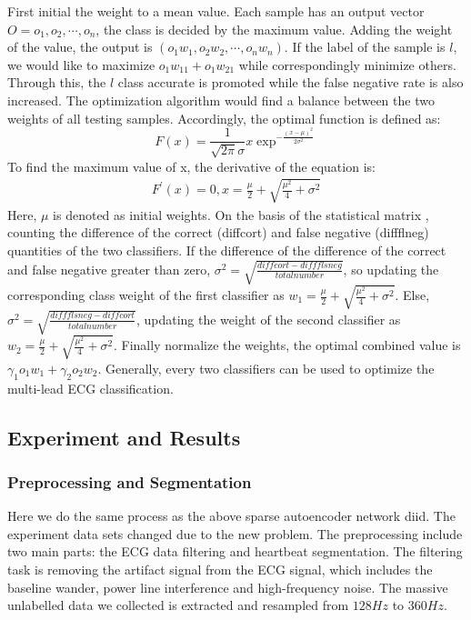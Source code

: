 \documentclass[graybox]{svmult}
\begin{document}
First initial the weight to a mean value. Each sample has an output vector $O = {o_1, o_2, \cdots, o_n}$, the class is decided by the maximum value. Adding the weight of the value, the output is $(o_1w_1 ,o_2w_2, \cdots, o_nw_n)$. If the label of the sample is $l$, we would like to maximize $o_1w_{11} + o_1w_{21}$ while correspondingly minimize others. Through this, the $l$ class accurate is promoted while the false negative rate is also increased. The optimization algorithm would find a balance between the two weights of all testing samples. Accordingly, the optimal function is defined as:
\begin{equation}
F(x) = \frac{1}{\sqrt{2\pi}\sigma}x\exp^{-\frac{(x-\mu)^2}{2\sigma^2}}
\end{equation}
To find the maximum value of x, the derivative of the equation is:
\begin{equation}
\begin{split}
F^{'}(x) = 0, x = \frac{\mu}{2}+\sqrt{\frac{\mu^2}{4}+\sigma^2}
\end{split}
\end{equation}
Here, $\mu$ is denoted as initial weights. On the basis of the statistical matrix , counting the difference of the correct (diffcort) and false negative (diffflneg) quantities of the two classifiers. If the difference of the difference of the correct and false negative greater than zero, $\sigma^2 = \sqrt{\frac{diffcort - diffflsneg}{totalnumber}}$, so updating the corresponding class weight of the first classifier as $w_1 = \frac{\mu}{2}+\sqrt{\frac{\mu^2}{4}+\sigma^2}$. Else, $\sigma^2 = \sqrt{\frac{diffflsneg - diffcort}{totalnumber}}$, updating the weight of the second classifier as $w_2 = \frac{\mu}{2}+\sqrt{\frac{\mu^2}{4}+\sigma^2}$. Finally normalize the weights, the optimal combined value is $\gamma_1o_1w_1 + \gamma_2o_2w_2$. Generally, every two classifiers can be used to optimize the multi-lead ECG classification.



\subsection{Experiment  and Results}
\subsubsection{Preprocessing and Segmentation}
Here we do the same process as the above sparse autoencoder network diid. The experiment data sets changed due to the new problem. The preprocessing include two main parts: the ECG data filtering and heartbeat segmentation. The filtering task is removing the artifact signal from the ECG signal, which includes the baseline wander, power line interference and high-frequency noise. The  massive unlabelled data we collected is extracted and resampled from $128Hz$ to $360Hz$. 
\end{document}

